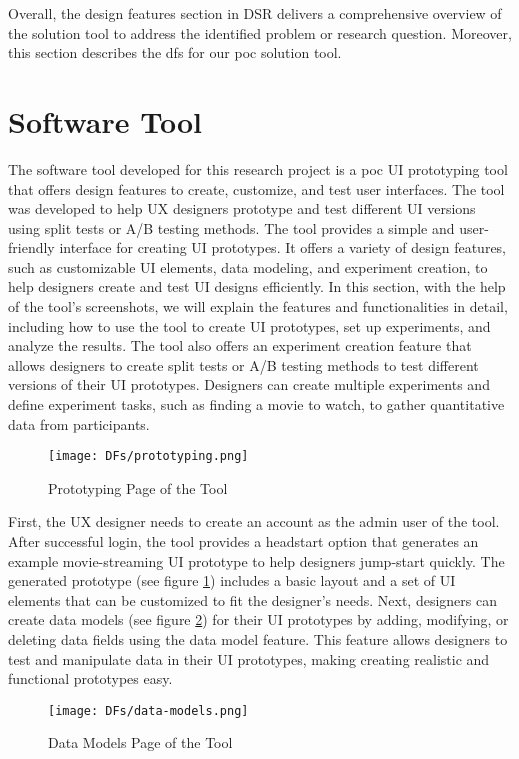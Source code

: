 Overall, the design features section in DSR delivers a comprehensive overview of the solution tool to address the identified problem or research question. 
Moreover, this section describes the \ac{df}s for our \ac{poc} solution tool.
\clearpage

\section{Software Tool}
\label{implementation:section:tool}
The software tool developed for this research project is a \ac{poc} UI prototyping tool that offers design features to create, customize, and test user interfaces. 
The tool was developed to help UX designers prototype and test different UI versions using split tests or A/B testing methods. 
The tool provides a simple and user-friendly interface for creating UI prototypes. 
It offers a variety of design features, such as customizable UI elements, data modeling, and experiment creation, to help designers create and test UI designs efficiently. 
In this section, with the help of the tool's screenshots, we will explain the features and functionalities in detail, including how to use the tool to create UI prototypes, set up experiments, and analyze the results.
The tool also offers an experiment creation feature that allows designers to create split tests or A/B testing methods to test different versions of their UI prototypes. 
Designers can create multiple experiments and define experiment tasks, such as finding a movie to watch, to gather quantitative data from participants.

\begin{figure}[ht]
    \centering
    \texttt{[image: DFs/prototyping.png]}
    \caption{Prototyping Page of the Tool}
    \label{implementation:fig:prototypingSol}
\end{figure}

First, the UX designer needs to create an account as the admin user of the tool. After successful login, the tool provides a headstart option that generates an example movie-streaming UI prototype to help designers jump-start quickly. 
The generated prototype (see figure \ref{implementation:fig:prototypingSol}) includes a basic layout and a set of UI elements that can be customized to fit the designer's needs.
Next, designers can create data models (see figure \ref{implementation:fig:datamodels}) for their UI prototypes by adding, modifying, or deleting data fields using the data model feature. 
This feature allows designers to test and manipulate data in their UI prototypes, making creating realistic and functional prototypes easy.
\begin{figure}[ht]
    \centering
    \texttt{[image: DFs/data-models.png]}
    \caption{Data Models Page of the Tool}
    \label{implementation:fig:datamodels}
\end{figure}

